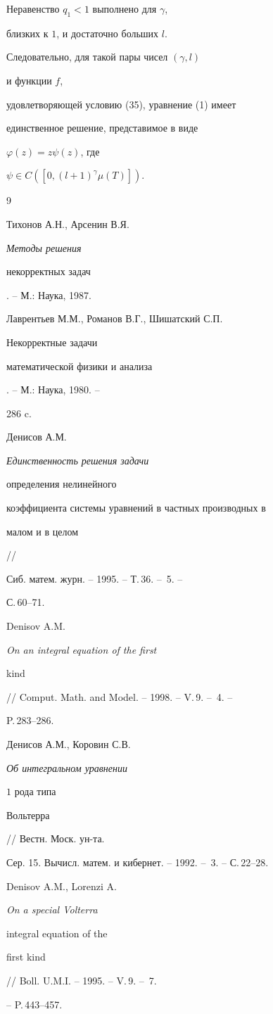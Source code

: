Неравенство $q_1<1$ выполнено для $\gamma$,


близких к $1$, и достаточно больших $l$.


Следовательно, для такой пары чисел $(\gamma,l)$


и функции $f$,


удовлетворяющей условию (35), уравнение (1) имеет


единственное решение, представимое в виде


$\varphi (z)=z\psi (z)$, где


$\psi \in C([0,(l+1)^\gamma \mu(T)])$.





\begin{thebibliography}{9}




Тихонов А.Н., Арсенин В.Я. {\em Методы решения


некорректных задач}. -- М.: Наука, 1987.




Лаврентьев М.М., Романов В.Г., Шишатский С.П. {\em


Некорректные задачи


математической физики и анализа}. -- М.: Наука, 1980. --


286 c.




Денисов А.М. {\em Единственность решения задачи


определения нелинейного


коэффициента системы уравнений в частных производных в


малом и в целом} //


Сиб. матем. журн. -- 1995. -- Т.\,36. -- \No\,5. --


С.\,60--71.




Denisov A.M. {\em On an integral equation of the first


kind} // Comput. Math. and Model. -- 1998. -- V.\,9. -- \No\,4. --


P.\,283--286.




Денисов А.М., Коровин С.В. {\em Об интегральном уравнении


$1$ рода типа


Вольтерра} // Вестн. Моск. ун-та.


Сер. 15. Вычисл. матем. и кибернет. -- 1992. -- \No\,3. -- С.\,22--28.




Denisov A.M., Lorenzi A. {\it On a special Volterra


integral equation of the


first kind} // Boll. U.M.I. -- 1995. -- V.\,9. -- \No\,7.


-- P.\,443--457.


\end{thebibliography}





